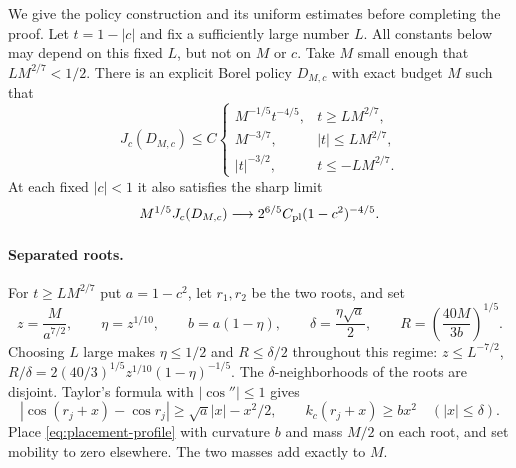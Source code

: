 We give the policy construction and its uniform estimates before
completing the proof. Let $t=1-|c|$ and fix a sufficiently large number
$L$. All constants below may depend on this fixed $L$, but not on $M$
or $c$. Take $M$ small enough that $LM^{2/7}<1/2$. There is an
explicit Borel policy
$D_{M,c}$ with exact budget $M$ such that
\begin{equation}\label{eq:oracle-uniform-trial}
 J_c(D_{M,c})\le C
 \begin{cases}
 M^{-1/5}t^{-4/5},&t\ge LM^{2/7},\\
 M^{-3/7},&|t|\le LM^{2/7},\\
 |t|^{-3/2},&t\le-LM^{2/7}.
 \end{cases}
\end{equation}
At each fixed $|c|<1$ it also satisfies the sharp limit
\begin{equation}\label{eq:oracle-pointwise-trial}
 M^{1/5}J_c(D_{M,c})\longrightarrow
                  2^{6/5}C_{\rm pl}(1-c^2)^{-4/5}.
\end{equation}

\paragraph{Separated roots.}
For $t\ge LM^{2/7}$ put $a=1-c^2$, let $r_1,r_2$ be the two roots,
and set
\begin{equation}\label{eq:oracle-sharp-policy}
 z=\frac{M}{a^{7/2}},\qquad \eta=z^{1/10},\qquad
 b=a(1-\eta),\qquad
 \delta=\frac{\eta\sqrt a}{2},\qquad
 R=\left(\frac{40M}{3b}\right)^{1/5}.
\end{equation}
Choosing $L$ large makes $\eta\le1/2$ and $R\le\delta/2$ throughout
this regime: $z\le L^{-7/2}$,
$R/\delta=2(40/3)^{1/5}z^{1/10}(1-\eta)^{-1/5}$.
The $\delta$-neighborhoods of the roots are disjoint. Taylor's formula
with $|\cos''|\le1$ gives
\[
 |\cos(r_j+x)-\cos r_j|\ge\sqrt a|x|-x^2/2,
 \qquad k_c(r_j+x)\ge b x^2\quad(|x|\le\delta).
\]
Place \eqref{eq:placement-profile} with curvature $b$ and mass $M/2$
on each root, and set mobility to zero elsewhere. The two masses add
exactly to $M$.

